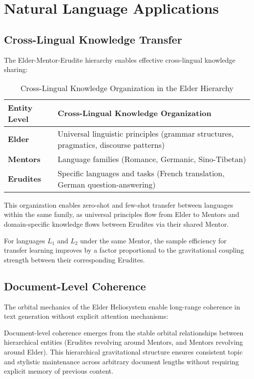 \section{Natural Language Applications}

\subsection{Cross-Lingual Knowledge Transfer}

The Elder-Mentor-Erudite hierarchy enables effective cross-lingual knowledge sharing:

\begin{table}[h]
\centering
\begin{tabular}{|p{3cm}|p{11cm}|}
\hline
\textbf{Entity Level} & \textbf{Cross-Lingual Knowledge Organization} \\
\hline
\textbf{Elder} & Universal linguistic principles (grammar structures, pragmatics, discourse patterns) \\
\hline
\textbf{Mentors} & Language families (Romance, Germanic, Sino-Tibetan) \\
\hline
\textbf{Erudites} & Specific languages and tasks (French translation, German question-answering) \\
\hline
\end{tabular}
\caption{Cross-Lingual Knowledge Organization in the Elder Hierarchy}
\end{table}

This organization enables zero-shot and few-shot transfer between languages within the same family, as universal principles flow from Elder to Mentors and domain-specific knowledge flows between Erudites via their shared Mentor.

\begin{theorem}
For languages $L_1$ and $L_2$ under the same Mentor, the sample efficiency for transfer learning improves by a factor proportional to the gravitational coupling strength between their corresponding Erudites.
\end{theorem}

\subsection{Document-Level Coherence}

The orbital mechanics of the Elder Heliosystem enable long-range coherence in text generation without explicit attention mechanisms:

\begin{proposition}
Document-level coherence emerges from the stable orbital relationships between hierarchical entities (Erudites revolving around Mentors, and Mentors revolving around Elder). This hierarchical gravitational structure ensures consistent topic and stylistic maintenance across arbitrary document lengths without requiring explicit memory of previous content.
\end{proposition}

